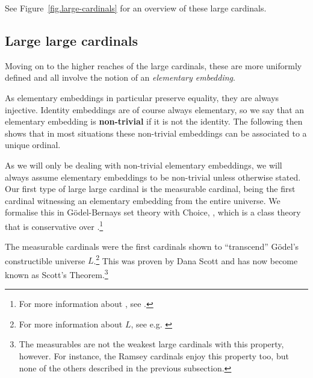\documentclass[../../main]{subfiles}
\begin{document}
See Figure~\ref{fig.large-cardinals} for an overview of these large cardinals.

\subsection{Large large cardinals}

Moving on to the higher reaches of the large cardinals, these are more uniformly defined and all involve the notion of an \textit{elementary embedding}.


As elementary embeddings in particular preserve equality, they are always injective. Identity embeddings are of course always elementary, so we say that an elementary embedding is \textbf{non-trivial} if it is not the identity. The following then shows that in most situations these non-trivial embeddings can be associated to a unique ordinal.


As we will only be dealing with non-trivial elementary embeddings, we will always assume elementary embeddings to be non-trivial unless otherwise stated. Our first type of large large cardinal is the measurable cardinal, being the first cardinal witnessing an elementary embedding from the entire universe. We formalise this in G\"odel-Bernays set theory with Choice, \gbc, which is a class theory that is conservative over \zfc.\footnote{For more information about \gbc, see \cite{gbc}.}


The measurable cardinals were the first cardinals shown to ``transcend'' G\"odel's constructible universe $L$.\footnote{For more information about $L$, see e.g. \cite{SchindlerBook}} This was proven by Dana Scott and has now become known as Scott's Theorem.\footnote{The measurables are not the weakest large cardinals with this property, however. For instance, the Ramsey cardinals enjoy this property too, but none of the others described in the previous subsection.}
\end{document}
